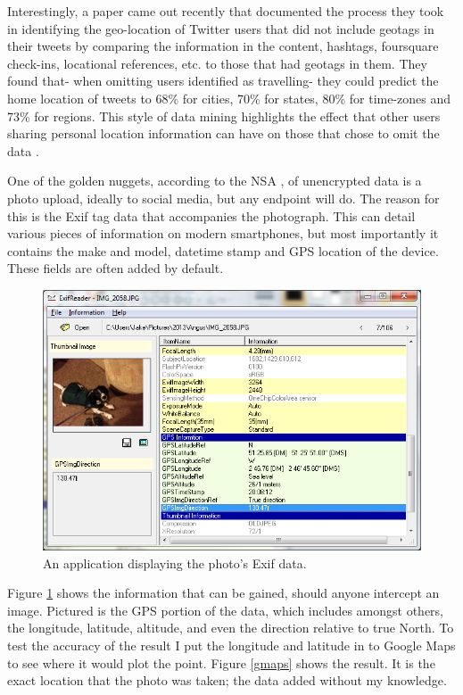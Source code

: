 Interestingly, a paper \cite{intro:twitter_home_location} came out recently that documented the process they took in identifying the geo-location of Twitter users that did not include geotags in their tweets by comparing the information in the content, hashtags, foursquare \cite{intro:foursquare_site} check-ins, locational references, etc. to those that had geotags \cite{intro:twitter_location_howto} in them. They found that- when omitting users identified as travelling- they could predict the home location of tweets to 68\% for cities, 70\% for states, 80\% for time-zones and 73\% for regions. This style of data mining highlights the effect that other users sharing personal location information can have on those that chose to omit the data \cite{intro:not_personal}. 

One of the golden nuggets, according to the NSA \cite{intro:angry_leak}, of unencrypted data is a photo upload, ideally to social media, but any endpoint will do. The reason for this is the Exif \cite{intro:exif_wiki} tag data that accompanies the photograph. This can detail various pieces of information on modern smartphones, but most importantly it contains the make and model, datetime stamp and GPS location \cite{intro:wiki_geotag} of the device. These fields are often added by default. 

\begin{figure}[htb!]
\centering\includegraphics{intro/diagrams/exif-data.png}
\caption{An application displaying the photo's Exif data.}
\label{angus}
\end{figure}
\clearpage

Figure \ref{angus} shows the information that can be gained, should anyone intercept an image. Pictured is the GPS portion of the data, which includes amongst others, the longitude, latitude, altitude, and even the direction relative to true North. To test the accuracy of the result I put the longitude and latitude in to Google Maps to see where it would plot the point. Figure \ref{gmaps} shows the result. It is the exact location that the photo was taken; the data added without my knowledge.

